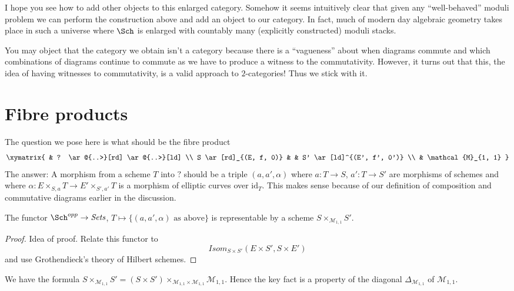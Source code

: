 \medskip\noindent
I hope you see how to add other objects to this enlarged category.
Somehow it seems intuitively clear that given any ``well-behaved''
moduli problem we can perform the construction above and add an object
to our category. In fact, much of modern day algebraic geometry takes
place in such a universe where $\Sch$ is enlarged with countably many
(explicitly constructed) moduli stacks.

\medskip\noindent
You may object that the category we obtain isn't a category because
there is a ``vagueness'' about when diagrams commute and which combinations
of diagrams continue to commute as we have to produce a witness
to the commutativity. However, it turns out that this, the idea of having
witnesses to commutativity, is a valid approach to $2$-categories!
Thus we stick with it.






\section{Fibre products}
\label{section-fibre-products}

\noindent
The question we pose here is what should be the fibre product
$$
\xymatrix{
& ? \ar@{..>}[rd] \ar@{..>}[ld] \\
S \ar[rd]_{(E, f, 0)} & & S' \ar[ld]^{(E', f', 0')} \\
& \mathcal{M}_{1, 1}
}
$$
The answer: A morphism from a scheme $T$ into $?$ should be a triple
$(a, a', \alpha)$ where
$a : T \to S$, $a' : T \to S'$ are morphisms of schemes
and where $\alpha : E \times_{S, a} T \to E' \times_{S', a'} T$ is
a morphism of elliptic curves over $\text{id}_T$. This makes sense
because of our definition of composition and commutative diagrams
earlier in the discussion.

\begin{lemma}
\label{lemma-key-fact}
The functor $\Sch^{opp} \to \textit{Sets}$,
$T \mapsto \{(a, a', \alpha)\text{ as above}\}$
is representable by a scheme $S \times_{\mathcal{M}_{1, 1}} S'$.
\end{lemma}

\begin{proof}
Idea of proof. Relate this functor to
$$
\mathit{Isom}_{S \times S'}(E \times S', S \times E')
$$
and use Grothendieck's theory of Hilbert schemes.
\end{proof}

\begin{remark}
\label{remark-diagonal}
We have the formula
$S \times_{\mathcal{M}_{1, 1}} S' =
(S \times S')
\times_{\mathcal{M}_{1, 1} \times \mathcal{M}_{1, 1}}
\mathcal{M}_{1, 1}$.
Hence the key fact is a property of the diagonal
$\Delta_{\mathcal{M}_{1, 1}}$ of $\mathcal{M}_{1, 1}$.
\end{remark}

